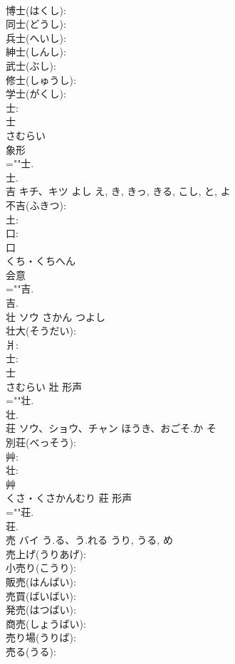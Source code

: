 \documentclass[8pt]{extreport}
\begin{document}
\begin{CJK}{UTF8}{min}
\\	博士(はくし): 
\\	同士(どうし): 
\\	兵士(へいし): 
\\	紳士(しんし): 
\\	武士(ぶし): 
\\	修士(しゅうし): 
\\	学士(がくし): 
\\	士: 
\\	士	
\\	さむらい	
\\	象形 
\\	=""士.
\\	士.
\\	吉	キチ、キツ	よし	え, き, きっ, きる, こし, と, よ	
\\	不吉(ふきつ): 
\\	土: 
\\	口: 
\\	口	
\\	くち・くちへん	
\\	会意 
\\	=""吉.
\\	吉.
\\	壮	ソウ	さかん	つよし	
\\	壮大(そうだい): 
\\	爿: 
\\	士: 
\\	士	
\\	さむらい	壯	形声 
\\	=""壮.
\\	壮.
\\	荘	ソウ、ショウ、チャン	ほうき、おごそ.か	そ	
\\	別荘(べっそう): 
\\	艸: 
\\	壮: 
\\	艸	
\\	くさ・くさかんむり	莊	形声 
\\	=""荘.
\\	荘.
\\	売	バイ	う.る、う.れる	うり, うる, め	
\\	売上げ(うりあげ): 
\\	小売り(こうり): 
\\	販売(はんばい): 
\\	売買(ばいばい): 
\\	発売(はつばい): 
\\	商売(しょうばい): 
\\	売り場(うりば): 
\\	売る(うる): 

\end{CJK}
\end{document}
